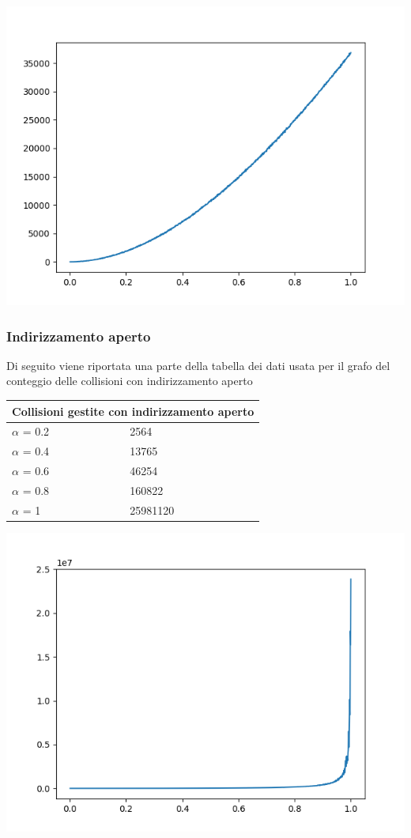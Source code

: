 \documentclass{article}
\begin{document}
\includegraphics[scale=0.75]{collisioni_concatenamento.png}

\subsubsection{Indirizzamento aperto}
Di seguito viene riportata una parte della tabella dei dati usata per il grafo del conteggio delle collisioni con indirizzamento aperto

\begin{tabular}{ |p{3cm}||p{3.5cm}|  }
 \hline
 \multicolumn{2}{|c|}{Collisioni gestite con indirizzamento aperto} \\
\hline
 $\alpha $ = 0.2 & 2564\\\hline
 $\alpha $ = 0.4 & 13765    \\\hline
 $\alpha $ = 0.6 & 46254 \\\hline
 $\alpha $ = 0.8 & 160822\\\hline
 $\alpha $ = 1 & 25981120  \\
 \hline
\end{tabular}

\includegraphics[scale=0.75]{collisioni_indirizzamento_aperto.png}
\end{document}
